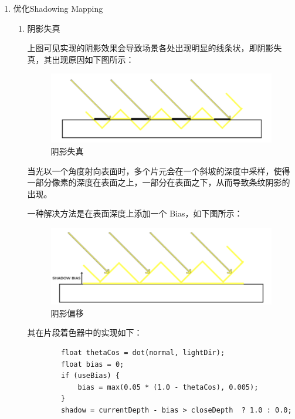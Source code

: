 \documentclass[12pt]{article}
\begin{document}
\begin{enumerate}
    \item 优化Shadowing Mapping
    \begin{enumerate}
        \item 阴影失真
        
        上图可见实现的阴影效果会导致场景各处出现明显的线条状，即阴影失真，其出现原因如下图所示：

        \begin{figure}[H]
            \centering
            \includegraphics[scale=0.5]{acne.png}
            \caption{阴影失真}
            \label{}
        \end{figure}

        当光以一个角度射向表面时，多个片元会在一个斜坡的深度中采样，使得一部分像素的深度在表面之上，一部分在表面之下，从而导致条纹阴影的出现。

        一种解决方法是在表面深度上添加一个 Bias，如下图所示：
        \begin{figure}[H]
            \centering
            \includegraphics[scale=0.5]{bias.png}
            \caption{阴影偏移}
            \label{}
        \end{figure}
        其在片段着色器中的实现如下：
        \begin{lstlisting}
        float thetaCos = dot(normal, lightDir);
        float bias = 0;
        if (useBias) {
            bias = max(0.05 * (1.0 - thetaCos), 0.005);
        }
        shadow = currentDepth - bias > closeDepth  ? 1.0 : 0.0;
        \end{lstlisting}


\end{enumerate}
\end{enumerate}
\end{document}

